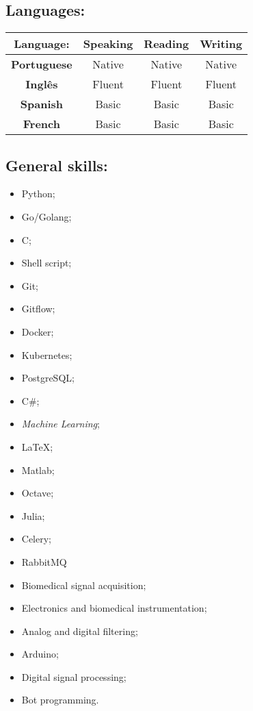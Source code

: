 \documentclass[11pt]{article}
\begin{document}
\subsection{Languages:}
\begin{center}
\begin{tabular}{c | c | c | c}
\hline
\textbf{Language:} & Speaking  & Reading & Writing \\
\hline
\hline
\textbf{Portuguese} &  Native & Native & Native  \\
\hline
\textbf{Inglês} &  Fluent & Fluent & Fluent  \\
\hline
\textbf{Spanish} & Basic & Basic & Basic \\
\hline
\textbf{French} & Basic & Basic & Basic \\
\hline
\end{tabular}
\end{center}


\subsection{General skills:}
\begin{multicols}{3} %
    \begin{itemize}
        \item Python;
        \item Go/Golang;
        \item C;
        \item Shell script;
        \item Git;
        \item Gitflow;
        \item Docker;
        \item Kubernetes;
        \item PostgreSQL;
        \item C\#;
        \item \textit{Machine Learning};
        \item \LaTeX ;
        \item Matlab;
        \item Octave;
        \item Julia;
        \item Celery;
        \item RabbitMQ
        \item Biomedical signal acquisition;
        \item Electronics and biomedical instrumentation;
        \item Analog and digital filtering;
        \item Arduino;
        \item Digital signal processing;
        \item Bot programming.
    \end{itemize}
\end{multicols}
\end{document}
